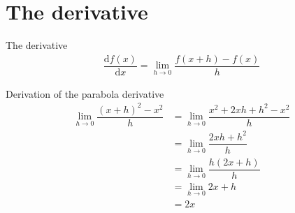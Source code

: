 \documentclass[notes]{beamer}
\begin{document}
    \section{The derivative}
    \begin{frame}{The derivative}
      \begin{align}
        \dfrac{\text{d} f(x)}{\text{d} x} = \lim_{h \rightarrow 0} \dfrac{f(x + h) - f(x)}{h}
      \end{align}
      \begin{figure}
        
      \end{figure}
    \end{frame}

    
    \begin{frame}{Derivation of the parabola derivative}
      \begin{align}
          \lim_{h \rightarrow 0} \dfrac{(x + h)^2 - x^2}{h} 
          & = \lim_{h \rightarrow 0} \dfrac{x^2 + 2xh + h^2 - x^2}{h}   \\
          & = \lim_{h \rightarrow 0} \dfrac{2xh + h^2}{h}  \\
          & = \lim_{h \rightarrow 0} \dfrac{h (2x + h)}{h}  \\
          & = \lim_{h \rightarrow 0} 2x + h \\
          & = 2x
      \end{align}
    \end{frame}
\end{document}
